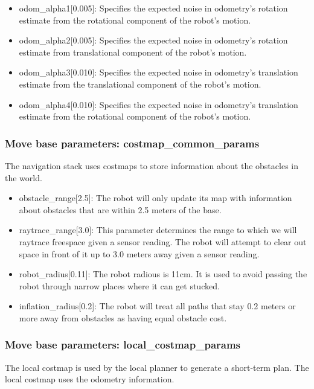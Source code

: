 \documentclass[10pt,journal,compsoc]{IEEEtran}
\begin{document}
\begin{itemize}
\item odom\_alpha1[0.005]: Specifies the expected noise in odometry's rotation estimate from the rotational component of the robot's motion.
\item odom\_alpha2[0.005]: Specifies the expected noise in odometry's rotation estimate from translational component of the robot's motion. 
\item odom\_alpha3[0.010]: Specifies the expected noise in odometry's translation estimate from the translational component of the robot's motion. 
\item odom\_alpha4[0.010]: Specifies the expected noise in odometry's translation estimate from the rotational component of the robot's motion.
\end{itemize}

\subsubsection{Move base parameters: costmap\_common\_params}

The navigation stack uses costmaps to store information about the obstacles in the world.

\begin{itemize}
\item obstacle\_range[2.5]: The robot will only update its map with information about obstacles that are within 2.5 meters of the base.
\item raytrace\_range[3.0]: This parameter determines the range to which we will raytrace freespace given a sensor reading. The robot will attempt to clear out space in front of it up to 3.0 meters away given a sensor reading.
\item robot\_radius[0.11]: The robot radious is 11cm. It is used to avoid passing the robot through narrow places where it can get stucked.
\item inflation\_radius[0.2]: The robot will treat all paths that stay 0.2 meters or more away from obstacles as having equal obstacle cost.
\end{itemize}
\subsubsection{Move base parameters: local\_costmap\_params}

The local costmap is used by the local planner to generate a short-term plan. The local costmap uses the odometry information.
\end{document}
